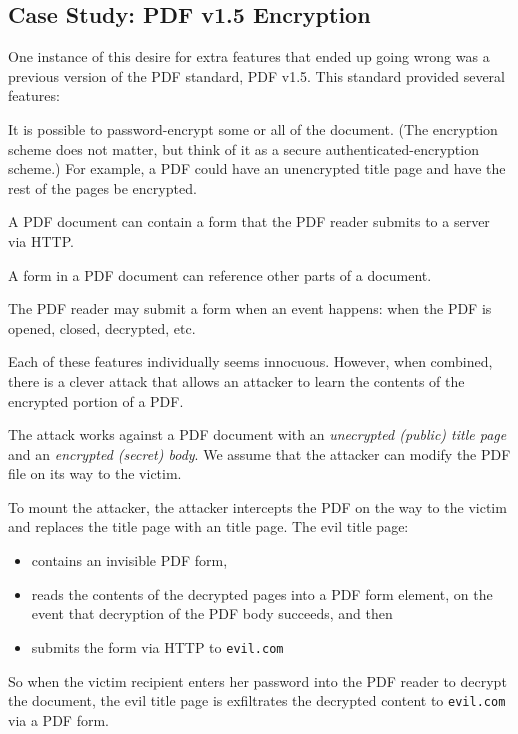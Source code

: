 \subsection{Case Study: PDF v1.5 Encryption}
One instance of this desire for extra features
that ended up going wrong was a previous version
of the PDF standard, PDF v1.5.\cite{muller2019practical}
This standard provided several features:
\begin{compactenum}
	\item It is possible to password-encrypt some or all of the document.
        (The encryption scheme does not matter, but think of it as
        a secure authenticated-encryption scheme.)
        For example, a PDF could have an unencrypted title page 
        and have the rest of the pages be encrypted.
	\item A PDF document can contain a form that the PDF reader
        submits to a server via HTTP.
	\item A form in a PDF document can reference other parts of a document.
	\item The PDF reader may submit a form when an event happens:
        when the PDF is opened, closed, decrypted, etc.
\end{compactenum}

Each of these features individually seems innocuous.
However, when combined, there is a clever attack that allows an attacker to 
learn the contents of the encrypted portion of a PDF.

The attack works against a PDF document with an \emph{unecrypted (public)
title page}
and an \emph{encrypted (secret) body}.
We assume that the attacker can modify the PDF 
file on its way to the victim.

To mount the attacker, the attacker intercepts the
PDF on the way to the victim and replaces the
title page with an  title page.
The evil title page:
\begin{itemize}[noitemsep]
    \item contains an invisible PDF form,
    \item reads the contents of the decrypted pages into a PDF form element,
          on the event that decryption of the PDF body succeeds, 
          and then
    \item submits the form via HTTP to \texttt{evil.com}
\end{itemize}
So when the victim recipient enters her password into the PDF
reader to decrypt the document, the evil title page is exfiltrates
the decrypted content to \texttt{evil.com} via a PDF form.

